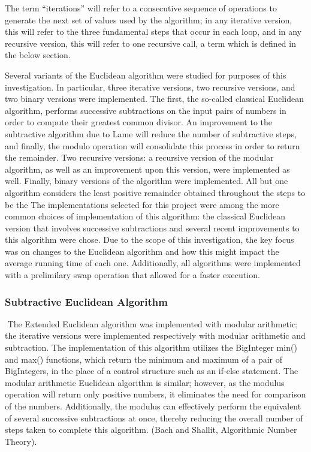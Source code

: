 \documentclass[11pt]{article}
\begin{document}
The term “iterations” will refer to a consecutive sequence of operations to generate the next set of values used by the algorithm; in any iterative version, this will refer to the three fundamental steps that occur in each loop, and in any recursive version, this will refer to one recursive call, a term which is defined in the below section.

\indent Several variants of the Euclidean algorithm were studied for purposes of this investigation. In particular, three iterative versions, two recursive versions, and two binary versions were implemented. The first, the so-called classical Euclidean algorithm, performs successive subtractions on the input pairs of numbers in order to compute their greatest common divisor.  An improvement to the subtractive algorithm due to Lame will reduce the number of subtractive steps, and finally, the modulo operation will consolidate this process in order to return the remainder. Two recursive versions: a recursive version of the modular algorithm, as well as an improvement upon this version, were implemented as well. Finally, binary versions of the algorithm were implemented. All but one algorithm considers the least positive remainder obtained throughout the steps to be the
The implementations selected for this project were among the more common choices of implementation of this algorithm: the classical Euclidean version that involves successive subtractions and several recent improvements to this algorithm were chose. Due to the scope of this investigation, the key focus was on changes to the Euclidean algorithm and how this might impact the average running time of each one. Additionally, all algorithms were implemented with a prelimilary swap operation that allowed for a faster execution.
\subsubsection{Subtractive Euclidean Algorithm} $ $
\indent The Extended Euclidean algorithm was implemented with modular arithmetic; the iterative versions were implemented respectively with modular arithmetic and subtraction. 
The implementation of this algorithm utilizes the BigInteger min() and max() functions, which return the minimum and maximum of a pair of BigIntegers, in the place of a control structure such as an if-else statement.
The modular arithmetic Euclidean algorithm is similar; however,  as the modulus operation will return only positive numbers, it eliminates the need for comparison of the numbers. Additionally, the modulus can effectively perform the equivalent of several successive subtractions at once, thereby reducing the overall number of steps taken to complete this algorithm. (Bach and Shallit, Algorithmic Number Theory).
\end{document}
